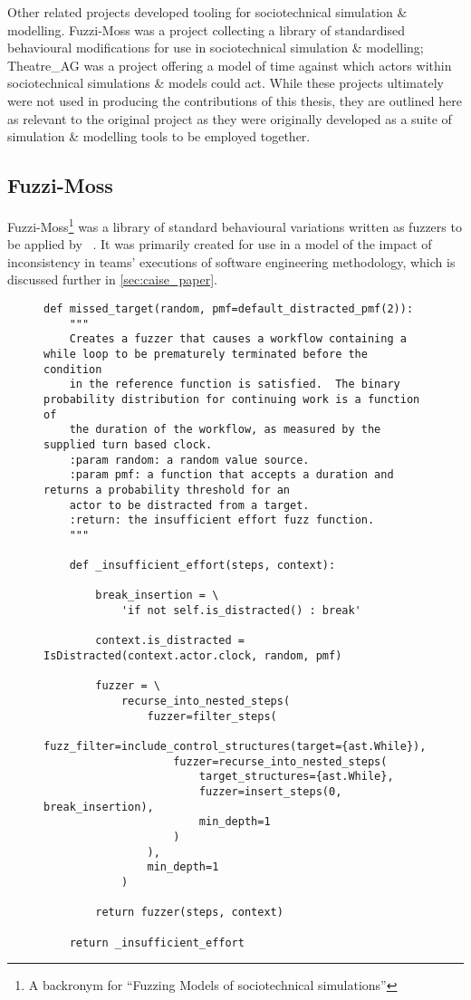 Other related projects developed tooling for sociotechnical simulation \&
modelling. Fuzzi-Moss was a project collecting a library of standardised
behavioural modifications for use in sociotechnical simulation \& modelling;
Theatre\_AG was a project offering a model of time against which actors within
sociotechnical simulations \& models could act. While these projects ultimately
were not used in producing the contributions of this thesis, they are outlined
here as relevant to the original \pdsf project as they were originally
developed as a suite of simulation \& modelling tools to be employed together.

\subsection{Fuzzi-Moss}\label{subsec:prior_work_fm}

Fuzzi-Moss\footnote{A backronym for ``Fuzzing Models of sociotechnical
simulations''} was a library of standard behavioural variations written as
fuzzers to be applied by \pdsf{}~\cite{fuzzimoss_repo}. It was primarily created
for use in a model of the impact of inconsistency in teams' executions of
software engineering methodology, which is discussed further in
\cref{sec:caise_paper}.

\begin{figure}
    \begin{lstlisting}
def missed_target(random, pmf=default_distracted_pmf(2)):
    """
    Creates a fuzzer that causes a workflow containing a while loop to be prematurely terminated before the condition
    in the reference function is satisfied.  The binary probability distribution for continuing work is a function of
    the duration of the workflow, as measured by the supplied turn based clock.
    :param random: a random value source.
    :param pmf: a function that accepts a duration and returns a probability threshold for an
    actor to be distracted from a target.
    :return: the insufficient effort fuzz function.
    """

    def _insufficient_effort(steps, context):

        break_insertion = \
            'if not self.is_distracted() : break'

        context.is_distracted = IsDistracted(context.actor.clock, random, pmf)

        fuzzer = \
            recurse_into_nested_steps(
                fuzzer=filter_steps(
                    fuzz_filter=include_control_structures(target={ast.While}),
                    fuzzer=recurse_into_nested_steps(
                        target_structures={ast.While},
                        fuzzer=insert_steps(0, break_insertion),
                        min_depth=1
                    )
                ),
                min_depth=1
            )

        return fuzzer(steps, context)

    return _insufficient_effort
    \end{lstlisting}
\end{figure}


